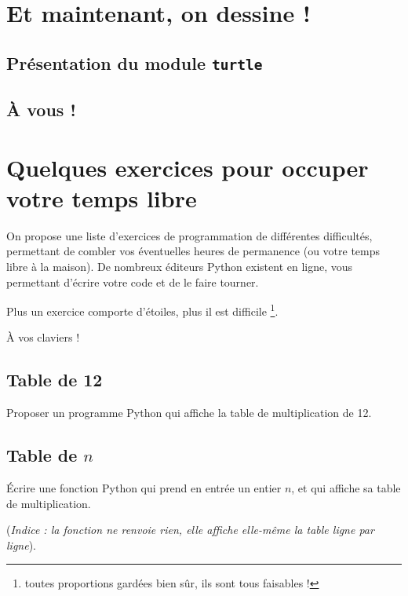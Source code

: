 \documentclass[12pt,a4paper, oneside]{article}
\begin{document}
\section{Et maintenant, on dessine !}\label{sec:et-maintenant-on-dessine-!}
   \subsection{Présentation du module \texttt{turtle}}\label{subsec:présentation-du-module-texttt-turtle}
   
   \subsection{À vous !}\label{subsec:à-vous-!}
   
\newpage

\section{Quelques exercices pour occuper votre temps libre}\label{sec:quelques-exercices-pour-occuper-votre-temps-libre}
   On propose une liste d'exercices de programmation de différentes difficultés, permettant de combler vos éventuelles heures de permanence (ou votre temps libre à la maison).
   De nombreux éditeurs Python existent en ligne, vous permettant d'écrire votre code et de le faire tourner.

   Plus un exercice comporte d'étoiles, plus il est difficile \footnote{toutes proportions gardées bien sûr, ils sont tous faisables !}.

   À vos claviers !

   \subsection{Table de 12}\label{subsec:table-de-12}
   Proposer un programme Python qui affiche la table de multiplication de 12.

   \subsection{Table de $n$}\label{subsec:table-de-n}
   Écrire une fonction Python qui prend en entrée un entier $n$, et qui affiche sa table de multiplication.

      (\textit{Indice : la fonction ne renvoie rien, elle affiche elle-même la table ligne par ligne}).
\end{document}
